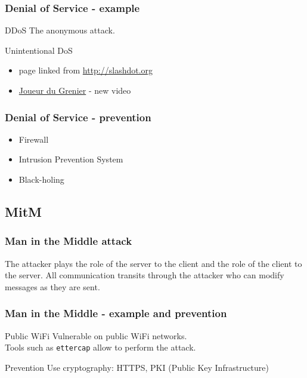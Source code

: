 \begin{frame}
\frametitle{Denial of Service - example}
\begin{exampleblock}{DDoS}
The anonymous attack.
\end{exampleblock}
\begin{exampleblock}{Unintentional DoS}
\begin{itemize}
\item page linked from \url{http://slashdot.org}
\item \href{http://www.joueurdugrenier.fr/}{Joueur du Grenier} - new video
\end{itemize}
\end{exampleblock}
\end{frame}

\begin{frame}
\frametitle{Denial of Service - prevention}
\begin{itemize}
\item Firewall
\item Intrusion Prevention System
\item Black-holing
\end{itemize}
\end{frame}

\subsection{MitM}

\begin{frame}
\frametitle{Man in the Middle attack}
The attacker plays the role of the server to the client and the role of the
client to the server.
All communication transits through the attacker who can modify messages as
they are sent.
\end{frame}

\begin{frame}
\frametitle{Man in the Middle - example and prevention}
\begin{exampleblock}{Public WiFi}
Vulnerable on public WiFi networks.
\\ Tools such as \texttt{ettercap} allow to perform the attack.
\end{exampleblock}
\begin{block}{Prevention}
Use cryptography: HTTPS, PKI (Public Key Infrastructure)
\end{block}
\end{frame}

